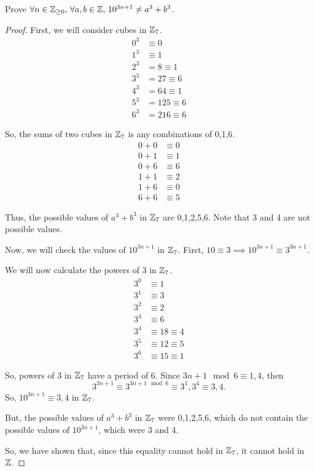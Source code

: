 \documentclass[../hw2]{subfiles}
\begin{document}
\begin{problem}[8]
Prove $\forall n \in \mathbb{Z}_{\ge 0},\, \forall a,b\in \mathbb{Z},\, 10^{3n+1}\neq a^3 + b^3$.
\end{problem}
\begin{proof}
	First, we will consider cubes in $\mathbb{Z}_7$.
	\begin{align*}
		0^3 & \equiv 0       \\
		1^3 & \equiv 1       \\
		2^3 & = 8 \equiv 1   \\
		3^3 & = 27 \equiv 6  \\
		4^3 & = 64 \equiv 1  \\
		5^3 & = 125 \equiv 6 \\
		6^3 & = 216 \equiv 6
	\end{align*}

	So, the sums of two cubes in $\mathbb{Z}_7$ is any combinations of 0,1,6.
	\begin{align*}
		0 + 0   & \equiv 0 \\
		0 +  1  & \equiv 1 \\
		0 + 6   & \equiv 6 \\
		1 + 1   & \equiv 2 \\
		1  +  6 & \equiv 0 \\
		6 + 6   & \equiv 5
	\end{align*}

	Thus, the possible values of $a^3 + b^3$ in $\mathbb{Z}_7$ are 0,1,2,5,6.
	Note that 3 and 4 are not possible values.

	Now, we will check the values of $10^{3n + 1}$ in $\mathbb{Z}_7$.
	First, $10\equiv 3\implies 10^{3n+1} \equiv 3^{3n+1}$.

	We will now calculate the powers of 3 in $\mathbb{Z}_7$.
	\begin{align*}
		3^0 & \equiv 1           \\
		3^1 & \equiv 3           \\
		3^2 & \equiv 2           \\
		3^3 & \equiv 6           \\
		3^4 & \equiv 18 \equiv 4 \\
		3^5 & \equiv 12 \equiv 5 \\
		3^6 & \equiv 15 \equiv 1
	\end{align*}

	So, powers of 3 in $\mathbb{Z}_7$ have a period of 6.
	Since $3n + 1 \mod{6} \equiv 1,4$, then \[
		3^{3n+1}\equiv 3^{3n + 1 \mod{6}}\equiv 3^1,3^4\equiv 3,4
		.\]
	So, $10^{3n+1}\equiv 3,4$ in $\mathbb{Z}_7$.

	But, the possible values of $a^3 + b^3$ in $\mathbb{Z}_7$ were 0,1,2,5,6, which do not contain the possible values of $10^{3n+1}$, which were 3 and 4.

	So, we have shown that, since this equality cannot hold in $\mathbb{Z}_7$, it cannot hold in $\mathbb{Z}$.
\end{proof}
\end{document}
